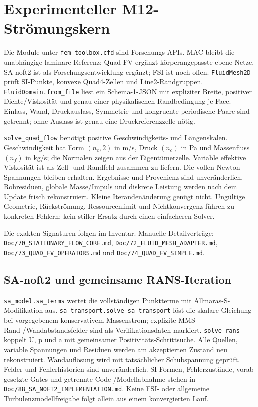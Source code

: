\chapter{Experimenteller M12-Strömungskern}
\label{api:cfd}
Die Module unter \texttt{fem\_toolbox.cfd} sind Forschungs-APIs.
MAC bleibt die unabhängige laminare Referenz; Quad-FV ergänzt körperangepasste
ebene Netze. SA-noft2 ist als Forschungsentwicklung ergänzt; FSI ist noch offen.
\texttt{FluidMesh2D} prüft SI-Punkte, konvexe Quad4-Zellen und Line2-Randgruppen.
\texttt{FluidDomain.from\_file} liest ein Schema-1-JSON mit expliziter Breite,
positiver Dichte/Viskosität und genau einer physikalischen Randbedingung je Face.
Einlass, Wand, Druckauslass, Symmetrie und kongruente periodische Paare sind
getrennt; ohne Auslass ist genau eine Druckreferenzzelle nötig.

\texttt{solve\_quad\_flow} benötigt positive Geschwindigkeits- und Längenskalen.
Geschwindigkeit hat Form $(n_c,2)$ in m/s, Druck $(n_c)$ in Pa und Massenfluss
$(n_f)$ in kg/s; die Normalen zeigen aus der Eigentümerzelle.
Variable effektive Viskosität ist als Zell- und Randfeld zusammen zu liefern.
Die vollen Newton-Spannungen bleiben erhalten. Ergebnisse und Provenienz sind
unveränderlich. Rohresiduen, globale Masse/Impuls und diskrete Leistung werden
nach dem Update frisch rekonstruiert. Kleine Iterandenänderung genügt nicht.
Ungültige Geometrie, Rückströmung, Ressourcenlimit und Nichtkonvergenz führen
zu konkreten Fehlern; kein stiller Ersatz durch einen einfacheren Solver.

Die exakten Signaturen folgen im Inventar. Manuelle Detailverträge:
\nolinkurl{Doc/70_STATIONARY_FLOW_CORE.md},
\nolinkurl{Doc/72_FLUID_MESH_ADAPTER.md},
\nolinkurl{Doc/73_QUAD_FV_OPERATORS.md} und
\nolinkurl{Doc/74_QUAD_FV_SIMPLE.md}.

\section{SA-noft2 und gemeinsame RANS-Iteration}
\texttt{sa\_model.sa\_terms} wertet die vollständigen Punktterme mit
Allmaras-S-Modifikation aus. \texttt{sa\_transport.solve\_sa\_transport}
löst die skalare Gleichung bei vorgegebenem konservativem Massenstrom;
explizite MMS-Rand-/Wandabstandsfelder sind als Verifikationsdaten markiert.
\texttt{solve\_rans} koppelt U, p und a mit gemeinsamer Positivitäts-Schrittsuche.
Alle Quellen, variable Spannungen und Residuen werden am akzeptierten Zustand
neu rekonstruiert. Wandauflösung wird mit tatsächlicher Schubspannung geprüft.
Felder und Fehlerhistorien sind unveränderlich. SI-Formen, Fehlerzustände,
vorab gesetzte Gates und getrennte Code-/Modellabnahme stehen in
\nolinkurl{Doc/88_SA_NOFT2_IMPLEMENTATION.md}. Keine FSI- oder allgemeine
Turbulenzmodellfreigabe folgt allein aus einem konvergierten Lauf.
